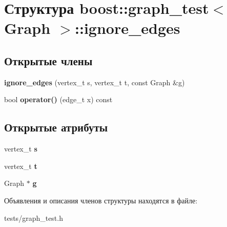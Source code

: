 \hypertarget{structboost_1_1graph__test_1_1ignore__edges}{}\section{Структура boost\+:\+:graph\+\_\+test$<$ Graph $>$\+:\+:ignore\+\_\+edges}
\label{structboost_1_1graph__test_1_1ignore__edges}
\subsection*{Открытые члены}
\begin{DoxyCompactItemize}
\item 
\mbox{\label{structboost_1_1graph__test_1_1ignore__edges_ab61f187b8da8f7a48b2422632e600d32}} 
{\bfseries ignore\+\_\+edges} (vertex\+\_\+t s, vertex\+\_\+t t, const Graph \&g)
\item 
\mbox{\label{structboost_1_1graph__test_1_1ignore__edges_a81277c81f4356e085bde27496e447dce}} 
bool {\bfseries operator()} (edge\+\_\+t x) const
\end{DoxyCompactItemize}
\subsection*{Открытые атрибуты}
\begin{DoxyCompactItemize}
\item 
\mbox{\label{structboost_1_1graph__test_1_1ignore__edges_a1ba173edcdc2115a8fb8d8711ea37064}} 
vertex\+\_\+t {\bfseries s}
\item 
\mbox{\label{structboost_1_1graph__test_1_1ignore__edges_a1567af3a3a271fe2b85001c25cb092fb}} 
vertex\+\_\+t {\bfseries t}
\item 
\mbox{\label{structboost_1_1graph__test_1_1ignore__edges_a154cb99d11abcbd0f1195b75eeb8c44c}} 
Graph $\ast$ {\bfseries g}
\end{DoxyCompactItemize}


Объявления и описания членов структуры находятся в файле\+:\begin{DoxyCompactItemize}
\item 
tests/graph\+\_\+test.\+h\end{DoxyCompactItemize}
